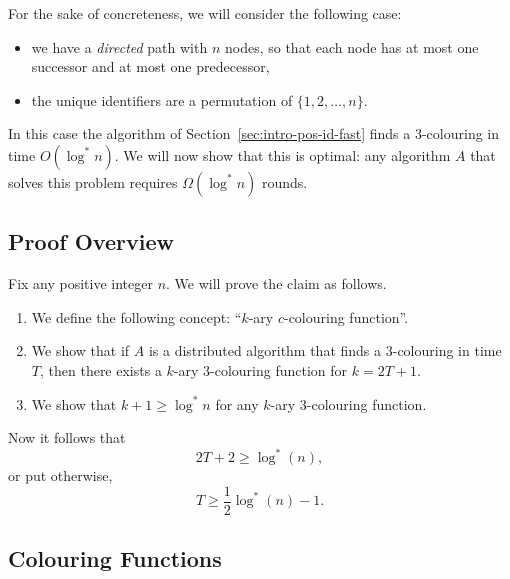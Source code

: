 For the sake of concreteness, we will consider the following case:
\begin{itemize}
    \item we have a \emph{directed} path with $n$ nodes, so that each node has at most one successor and at most one predecessor,
    \item the unique identifiers are a permutation of $\{1,2,\dotsc,n\}$.
\end{itemize}
In this case the algorithm of Section~\ref{sec:intro-pos-id-fast} finds a $3$-colouring in time $O(\log^* n)$. We will now show that this is optimal: any algorithm $A$ that solves this problem requires $\Omega(\log^* n)$ rounds.


\subsection{Proof Overview}

Fix any positive integer $n$. We will prove the claim as follows.
\begin{enumerate}
    \item We define the following concept: ``$k$-ary $c$-colouring function''.
    \item We show that if $A$ is a distributed algorithm that finds a $3$-colouring in time $T$, then there exists a $k$-ary $3$-colouring function for $k = 2T+1$.
    \item We show that $k + 1 \ge \log^* n$ for any $k$-ary $3$-colouring function.
\end{enumerate}
Now it follows that
\[
    2T + 2 \ge \log^*(n),
\]
or put otherwise,
\[
    T \ge \frac{1}{2}\log^*(n) - 1.
\]


\subsection{Colouring Functions}

